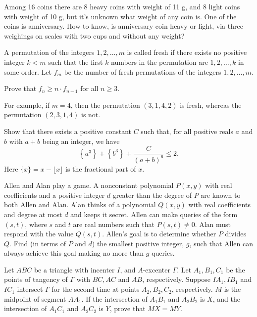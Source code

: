 \documentclass[11pt]{scrartcl}
\begin{document}
\begin{problem}[709461884323637120]
Among 16 coins there are 8 heavy coins with weight of 11 g, and 8 light coins with weight of 10 g, but it's unknown what weight of any coin is. One of the coins is anniversary. How to know, is anniversary coin heavy or light, via three weighings on scales with two cups and without any weight?
\end{problem}
\begin{problem}[742398043567245501]
	A permutation of the integers $1, 2, \ldots, m$ is called fresh if there exists no positive integer $k < m$ such that the first $k$ numbers in the permutation are $1, 2, \ldots, k$ in some order. Let $f_m$ be the number of fresh permutations of the integers $1, 2, \ldots, m$.

Prove that $f_n \ge n \cdot f_{n - 1}$ for all $n \ge 3$.

For example, if $m = 4$, then the permutation $(3, 1, 4, 2)$ is fresh, whereas the permutation $(2, 3, 1, 4)$ is not.
\end{problem}
\begin{problem}[764206163868751091]
	Show that there exists a positive constant $C$ such that, for all positive reals $a$ and $b$ with $a + b$ being an integer, we have
$$\left\{a^3\right\} + \left\{b^3\right\} + \frac{C}{(a+b)^6} \le 2. $$Here $\{x\} = x - \lfloor x\rfloor$ is the fractional part of $x$.
\end{problem}
\begin{problem}[780198795852911131]
Allen and Alan play a game. A nonconstant polynomial $P(x,y)$ with real coefficients and a positive integer $d$ greater than the degree of $P$ are known to both Allen and Alan. Alan thinks of a polynomial $Q(x,y)$ with real coefficients and degree at most $d$ and keeps it secret. Allen can make queries of the form $(s,t)$, where $s$ and $t$ are real numbers such that $P(s,t)\neq0$. Alan must respond with the value $Q(s,t)$. Allen's goal is to determine whether $P$ divides $Q$. Find (in terms of $P$ and $d$) the smallest positive integer, $g$, such that Allen can always achieve this goal making no more than $g$ queries.
\end{problem}
\begin{problem}[791423398948046269]
Let $ABC$ be a triangle with incenter $I$, and $A$-excenter $\Gamma$. Let $A_1,B_1,C_1$ be the points of tangency of $\Gamma$ with $BC,AC$ and $AB$, respectively. Suppose $IA_1, IB_1$ and $IC_1$ intersect $\Gamma$ for the second time at points $A_2,B_2,C_2$, respectively. $M$ is the midpoint of segment $AA_1$. If the intersection of $A_1B_1$ and $A_2B_2$ is $X$, and the intersection of $A_1C_1$ and $A_2C_2$ is $Y$, prove that $MX=MY$.
\end{problem}
\end{document}
